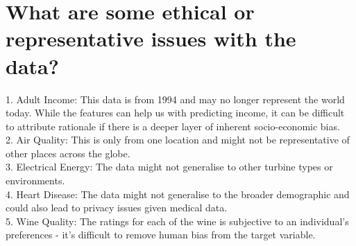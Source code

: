 \documentclass[11pt]{article}
\begin{document}
\section{What are some ethical or representative issues with the data?}
1. Adult Income: This data is from 1994 and may no longer represent the world today. While the features can help us with predicting income, it can be difficult to attribute rationale if there is a deeper layer of inherent socio-economic bias. \\
2. Air Quality: This is only from one location and might not be representative of other places across the globe. \\
3. Electrical Energy: The data might not generalise to other turbine types or environments. \\
4. Heart Disease: The data might not generalise to the broader demographic and could also lead to privacy issues given medical data. \\
5. Wine Quality: The ratings for each of the wine is subjective to an individual's preferences - it's difficult to remove human bias from the target variable.
\end{document}
